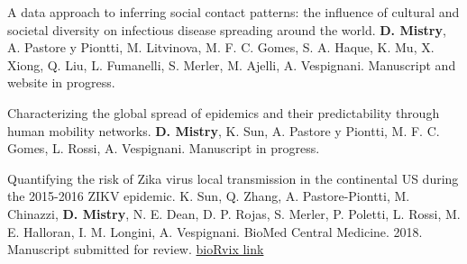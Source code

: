 \begin{cventries}
  \cvpublicationentry
    {A data approach to inferring social contact patterns: the influence of cultural and societal diversity on infectious disease spreading around the world.} %
    {\textbf{D. Mistry}, A. Pastore y Piontti, M. Litvinova, M. F. C. Gomes, S. A. Haque, K. Mu, X. Xiong, Q. Liu, L. Fumanelli, S. Merler, M. Ajelli, A. Vespignani.} %
    {} %
    {} %
    {} %
    {} %
    {} %
    {Manuscript and website in progress.} %
    {} %
    
  \cvpublicationentry
    {Characterizing the global spread of epidemics and their predictability through human mobility networks.} %
    {\textbf{D. Mistry}, K. Sun, A. Pastore y Piontti, M. F. C. Gomes, L. Rossi, A. Vespignani.} %
    {} %
    {} %
    {} %
    {} %
    {} %
    {Manuscript in progress.} %
    {} %
    
  \cvpublicationentry
    {Quantifying the risk of Zika virus local transmission in the continental US during the 2015-2016 ZIKV epidemic.} %
    {K. Sun, Q. Zhang, A. Pastore-Piontti, M. Chinazzi, \textbf{D. Mistry}, N. E. Dean, D. P. Rojas, S. Merler, P. Poletti, L. Rossi, M. E. Halloran, I. M. Longini, A. Vespignani.} %
    {BioMed Central Medicine.} %
    {} %
    {} %
    {} %
    {2018.} %
    {Manuscript submitted for review.} %
    {\href{https:/doi.org/10.1101/298315}{bioRvix link}} %


\end{cventries}
